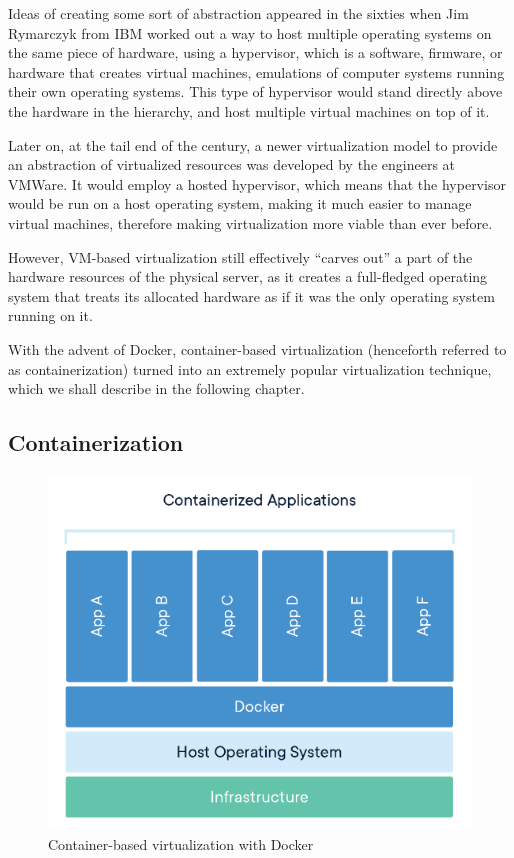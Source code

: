 \documentclass[thesis=B,english]{FITthesis}[2019/12/23]
\begin{document}
Ideas of creating some sort of abstraction appeared in the sixties when Jim Rymarczyk from IBM worked out a way to host multiple operating systems on the same piece of hardware, using a hypervisor, which is a software, firmware, or hardware that creates virtual machines, emulations of computer systems running their own operating systems. This type of hypervisor would stand directly above the hardware in the hierarchy, and host multiple virtual machines on top of it. \cite{virtualization}

Later on, at the tail end of the century, a newer virtualization model to provide an abstraction of virtualized resources was developed by the engineers at VMWare. \cite{vmware} It would employ a hosted hypervisor, which means that the hypervisor would be run on a host operating system, making it much easier to manage virtual machines, therefore making virtualization more viable than ever before. \cite{virtualization}

However, VM-based virtualization still effectively “carves out” a part of the hardware resources of the physical server, as it creates a full-fledged operating system that treats its allocated hardware as if it was the only operating system running on it.

With the advent of Docker, container-based virtualization (henceforth referred to as containerization) turned into an extremely popular virtualization technique, which we shall describe in the following chapter. 


\subsection{Containerization}

\begin{figure}[H]
\centering
\caption{Container-based virtualization with Docker \cite{what-container}}
\hspace*{-0.65cm}
\includegraphics[scale=0.75]{containerization}
\end{figure}
\end{document}
